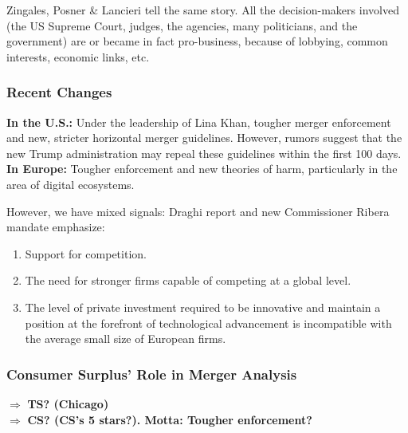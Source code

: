             Zingales, Posner \& Lancieri tell the same story. All the decision-makers involved (the US Supreme Court, judges, the agencies, many politicians, and the government) are or became in fact pro-business, because of lobbying, common interests, economic links, etc.             

        \subsubsection{Recent Changes}

            \textbf{In the U.S.:} Under the leadership of Lina Khan, tougher merger enforcement and new, stricter horizontal merger guidelines.
            However, rumors suggest that the new Trump administration may repeal these guidelines within the first 100 days. \\

            \noindent
            \textbf{In Europe:} Tougher enforcement and new theories of harm, particularly in the area of digital ecosystems.

            \noindent
            However, we have mixed signals: Draghi report and new Commissioner Ribera mandate emphasize:
                \begin{enumerate}
                    \item Support for competition.
                    \item The need for stronger firms capable of competing at a global level.
                    \item The level of private investment required to be innovative and maintain a position at the forefront of technological advancement is incompatible with the average small size of European firms.
                \end{enumerate}

        \subsubsection{Consumer Surplus' Role in Merger Analysis}

            \noindent
            \(\Rightarrow\) \textbf{TS? (Chicago)} \\
            \(\Rightarrow\) \textbf{CS? (CS’s 5 stars?). Motta: Tougher enforcement?} \\
            
